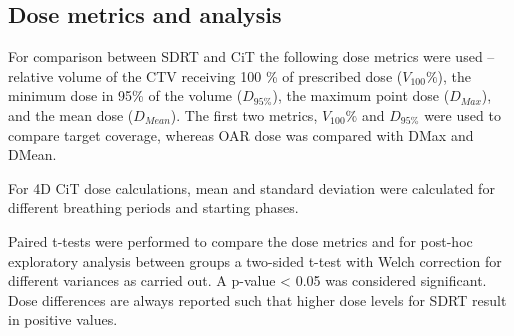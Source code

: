 \documentclass[type=dr, dr=rernat, accentcolor=tud7b,colorbacktitle, bigchapter, openright, twoside, 12pt ]{tudthesis}
\begin{document}
\subsection{Dose metrics and analysis}

For comparison between SDRT and CiT the following dose metrics were used – relative volume of the CTV receiving 100 \% of prescribed dose ($V_{100}\%$), 
the minimum dose in 95\% of the volume ($D_{95\%}$), the maximum point dose ($D_{Max}$), and the mean dose ($D_{Mean}$). The first two metrics, $V_{100}\%$ and $D_{95\%}$ were used 
to compare target coverage, whereas OAR dose was compared with DMax and DMean.

For 4D CiT dose calculations, mean and standard deviation were calculated for different breathing periods and starting phases.

Paired t-tests were performed to compare the dose metrics and for post-hoc exploratory analysis between groups a two-sided t-test with Welch correction for different variances
as carried out. A p-value < 0.05 was considered significant. Dose differences are always reported such that higher dose levels for SDRT result in positive values.


{}
\end{document}
